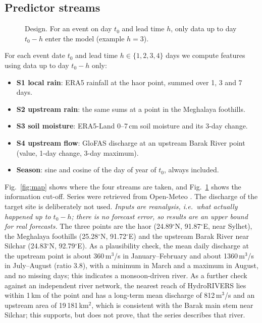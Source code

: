 \subsection{Predictor streams}\label{sec:streams}
\begin{figure}[t]
\centering{}
\caption{Design. For an event on day $t_0$ and lead time $h$, only data up to day $t_0-h$ enter the model (example $h=3$).}\label{fig:design}
\end{figure}
For each event date $t_0$ and lead time $h\in\{1,2,3,4\}$ days we compute features using data up to day $t_0-h$ only:
\begin{itemize}
\item \textbf{S1 local rain}: ERA5 rainfall \cite{hersbach2020} at the haor point, summed over 1, 3 and 7 days.
\item \textbf{S2 upstream rain}: the same sums at a point in the Meghalaya foothills.
\item \textbf{S3 soil moisture}: ERA5-Land 0--7\,cm soil moisture and its 3-day change.
\item \textbf{S4 upstream flow}: GloFAS discharge \cite{harrigan2020} at an upstream Barak River point (value, 1-day change, 3-day maximum).
\item \textbf{Season}: sine and cosine of the day of year of $t_0$, always included.
\end{itemize}
Fig.~\ref{fig:map} shows where the four streams are taken, and Fig.~\ref{fig:design} shows the information cut-off. Series were retrieved from Open-Meteo \cite{openmeteo}. The discharge of the target site is deliberately not used. \emph{Inputs are reanalysis, i.e.\ what actually happened up to $t_0-h$; there is no forecast error, so results are an upper bound for real forecasts.} The three points are the haor (24.89$^\circ$N, 91.87$^\circ$E, near Sylhet), the Meghalaya foothills (25.28$^\circ$N, 91.72$^\circ$E) and the upstream Barak River near Silchar (24.83$^\circ$N, 92.79$^\circ$E). As a plausibility check, the mean daily discharge at the upstream point is about 360\,m$^3$/s in January--February and about 1360\,m$^3$/s in July--August (ratio 3.8), with a minimum in March and a maximum in August, and no missing days; this indicates a monsoon-driven river. As a further check against an independent river network, the nearest reach of HydroRIVERS \cite{lehner2013} lies within 1\,km of the point and has a long-term mean discharge of 812\,m$^3$/s and an upstream area of 19\,181\,km$^2$, which is consistent with the Barak main stem near Silchar; this supports, but does not prove, that the series describes that river.

